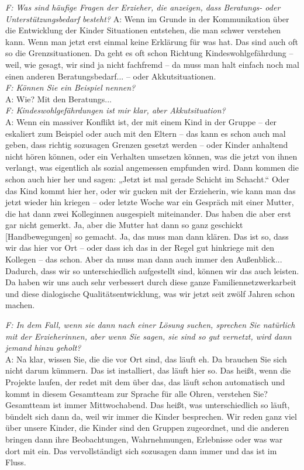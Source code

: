 \begin{linenumbers*}
\emph{F: Was sind häufige Fragen der Erzieher, die anzeigen, dass Beratungs- oder Unterstützungsbedarf besteht?}
A: Wenn im Grunde in der Kommunikation über die Entwicklung der Kinder Situationen entstehen, die man schwer verstehen kann. Wenn man jetzt erst einmal keine Erklärung für was hat. Das sind auch oft so die Grenzsituationen. Da geht es oft schon Richtung Kindeswohlgefährdung -- weil, wie gesagt, wir sind ja nicht fachfremd -- da muss man halt einfach noch mal einen anderen Beratungsbedarf... -- oder Akkutsituationen.\\ 
\emph{F: Können Sie ein Beispiel nennen?}\\
A: Wie? Mit den Beratungs...\\
\emph{F: Kindeswohlgefährdungen ist mir klar, aber Akkutsituation?}\\
A: Wenn ein massiver Konflikt ist, der mit einem Kind in der Gruppe -- der eskaliert zum Beispiel oder auch mit den Eltern -- das kann es schon auch mal geben, dass richtig sozusagen Grenzen gesetzt werden -- oder Kinder anhaltend nicht hören können, oder ein Verhalten umsetzen können, was die jetzt von ihnen verlangt, was eigentlich als sozial angemessen empfunden wird. Dann kommen die schon auch hier her und sagen: „Jetzt ist mal gerade Schicht im Schacht.“ Oder das Kind kommt hier her, oder wir gucken mit der Erzieherin, wie kann man das jetzt wieder hin kriegen -- oder letzte Woche war ein Gespräch mit einer Mutter, die hat dann zwei Kolleginnen ausgespielt miteinander. Das haben die aber erst gar nicht gemerkt. Ja, aber die Mutter hat dann so ganz geschickt [Handbewegungen] so gemacht. Ja, das muss man dann klären. Das ist so, dass wir das hier vor Ort -- oder dass ich das in der Regel gut hinkriege mit den Kollegen -- das schon. Aber da muss man dann auch immer den Außenblick... Dadurch, dass wir so unterschiedlich aufgestellt sind, können wir das auch leisten. Da haben wir uns auch sehr verbessert durch diese ganze Familiennetzwerkarbeit und diese dialogische Qualitätsentwicklung, was wir jetzt seit zwölf Jahren schon machen. 

\emph{F: In dem Fall, wenn sie dann nach einer Lösung suchen, sprechen Sie natürlich mit der Erzieherinnen, aber wenn Sie sagen, sie sind so gut vernetzt, wird dann jemand hinzu geholt?}\\
A: Na klar, wissen Sie, die die vor Ort sind, das läuft eh. Da brauchen Sie sich nicht darum kümmern. Das ist installiert, das läuft hier so. Das heißt, wenn die Projekte laufen, der redet mit dem über das, das läuft schon automatisch und kommt in diesem Gesamtteam zur Sprache für alle Ohren, verstehen Sie?\\
Gesamtteam ist immer Mittwochabend. Das heißt, was unterschiedlich so läuft, bündelt sich dann da, weil wir immer die Kinder besprechen. Wir reden ganz viel über unsere Kinder, die Kinder sind den Gruppen zugeordnet, und die anderen bringen dann ihre Beobachtungen, Wahrnehmungen, Erlebnisse oder was war dort mit ein. Das vervollständigt sich sozusagen dann immer und das ist im Fluss.


\end{linenumbers*}
